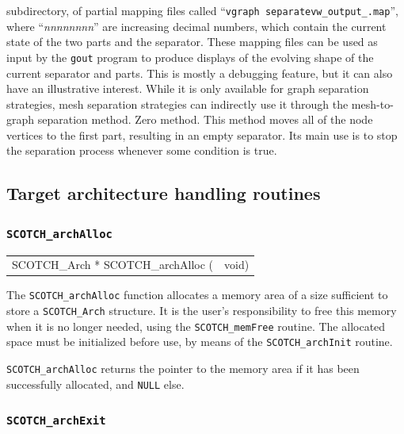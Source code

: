 \begin{itemize}
subdirectory, of partial mapping files called ``{\tt vgraph\lbt
separate\lbt vw\_\lbt output\_.map}'', where
``{\it nnnnnnnn}'' are increasing decimal numbers, which contain the
current state of the two parts and the separator. These mapping files
can be used as input by the {\tt gout} program to produce displays of
the evolving shape of the current separator and parts. This is mostly
a debugging feature, but it can also have an illustrative interest.
While it is only available for graph separation strategies, mesh
separation strategies can indirectly use it through the mesh-to-graph
separation method.
\iteme[{\tt z}]
Zero method. This method moves all of the node vertices to the first
part, resulting in an empty separator. Its main use is to stop the
separation process whenever some condition is true.
\end{itemize}

\subsection{Target architecture handling routines}
\label{sec-lib-arch-handling}

\subsubsection{{\tt SCOTCH\_archAlloc}}

\begin{itemize}
\progsyn

{\tt\begin{tabular}{l@{}l}
SCOTCH\_Arch * SCOTCH\_archAlloc ( & void)
\end{tabular}}

\progdes

The {\tt SCOTCH\_archAlloc} function allocates a memory area of a
size sufficient to store a {\tt SCOTCH\_\lbt Arch} structure. It is
the user's responsibility to free this memory when it is no longer
needed, using the {\tt SCOTCH\_\lbt mem\lbt Free} routine. The
allocated space must be initialized before use, by means of the
{\tt SCOTCH\_\lbt arch\lbt Init} routine.

\progret

{\tt SCOTCH\_archAlloc} returns the pointer to the memory area if it
has been successfully allocated, and {\tt NULL} else.
\end{itemize}

\subsubsection{{\tt SCOTCH\_archExit}}

